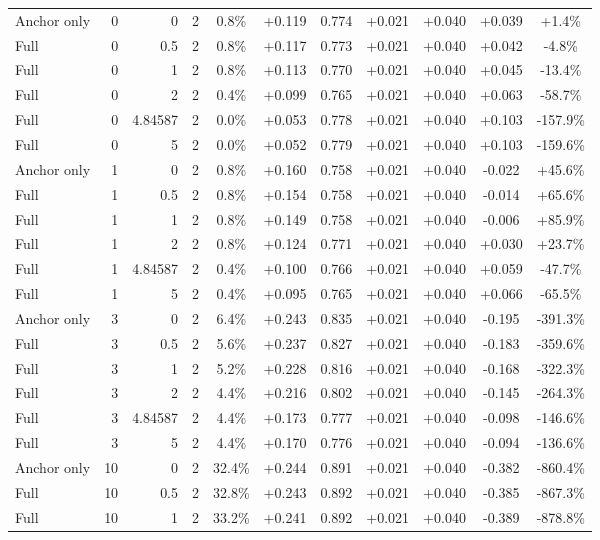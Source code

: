 \begin{table}[htbp]
\begin{tabular}{lrrrccccccc}
Anchor only & 0 & 0 & 2 & 0.8\% & +0.119 & 0.774 & +0.021 & +0.040 & +0.039 & +1.4\% \\
Full & 0 & 0.5 & 2 & 0.8\% & +0.117 & 0.773 & +0.021 & +0.040 & +0.042 & -4.8\% \\
Full & 0 & 1 & 2 & 0.8\% & +0.113 & 0.770 & +0.021 & +0.040 & +0.045 & -13.4\% \\
Full & 0 & 2 & 2 & 0.4\% & +0.099 & 0.765 & +0.021 & +0.040 & +0.063 & -58.7\% \\
Full & 0 & 4.84587 & 2 & 0.0\% & +0.053 & 0.778 & +0.021 & +0.040 & +0.103 & -157.9\% \\
Full & 0 & 5 & 2 & 0.0\% & +0.052 & 0.779 & +0.021 & +0.040 & +0.103 & -159.6\% \\
Anchor only & 1 & 0 & 2 & 0.8\% & +0.160 & 0.758 & +0.021 & +0.040 & -0.022 & +45.6\% \\
Full & 1 & 0.5 & 2 & 0.8\% & +0.154 & 0.758 & +0.021 & +0.040 & -0.014 & +65.6\% \\
Full & 1 & 1 & 2 & 0.8\% & +0.149 & 0.758 & +0.021 & +0.040 & -0.006 & +85.9\% \\
Full & 1 & 2 & 2 & 0.8\% & +0.124 & 0.771 & +0.021 & +0.040 & +0.030 & +23.7\% \\
Full & 1 & 4.84587 & 2 & 0.4\% & +0.100 & 0.766 & +0.021 & +0.040 & +0.059 & -47.7\% \\
Full & 1 & 5 & 2 & 0.4\% & +0.095 & 0.765 & +0.021 & +0.040 & +0.066 & -65.5\% \\
Anchor only & 3 & 0 & 2 & 6.4\% & +0.243 & 0.835 & +0.021 & +0.040 & -0.195 & -391.3\% \\
Full & 3 & 0.5 & 2 & 5.6\% & +0.237 & 0.827 & +0.021 & +0.040 & -0.183 & -359.6\% \\
Full & 3 & 1 & 2 & 5.2\% & +0.228 & 0.816 & +0.021 & +0.040 & -0.168 & -322.3\% \\
Full & 3 & 2 & 2 & 4.4\% & +0.216 & 0.802 & +0.021 & +0.040 & -0.145 & -264.3\% \\
Full & 3 & 4.84587 & 2 & 4.4\% & +0.173 & 0.777 & +0.021 & +0.040 & -0.098 & -146.6\% \\
Full & 3 & 5 & 2 & 4.4\% & +0.170 & 0.776 & +0.021 & +0.040 & -0.094 & -136.6\% \\
Anchor only & 10 & 0 & 2 & 32.4\% & +0.244 & 0.891 & +0.021 & +0.040 & -0.382 & -860.4\% \\
Full & 10 & 0.5 & 2 & 32.8\% & +0.243 & 0.892 & +0.021 & +0.040 & -0.385 & -867.3\% \\
Full & 10 & 1 & 2 & 33.2\% & +0.241 & 0.892 & +0.021 & +0.040 & -0.389 & -878.8\% \\

\end{tabular}
\end{table}
